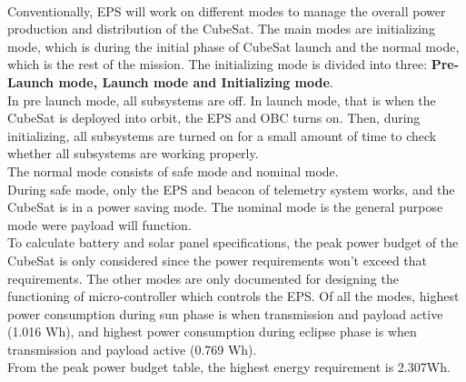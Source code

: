 \\
 Conventionally, EPS will work on different modes to manage the overall power production and distribution of the CubeSat. The main modes are initializing mode, which is during the initial phase of CubeSat launch and the normal mode, which is the rest of the mission. The initializing mode is divided into three: {\bf Pre- Launch mode, Launch mode and Initializing mode}. 
 \\In pre launch mode, all subsystems are off. In launch mode, that is when the CubeSat is deployed into orbit, the EPS and OBC turns on. Then, during initializing, all subsystems are turned on for a small amount of time to check whether all subsystems are working properly. \\The normal mode consists of safe mode and nominal mode. \\During safe mode, only the EPS and beacon of telemetry system works, and the CubeSat is in a power saving mode. The nominal mode is the general purpose mode were payload will function.
 \\
 To calculate battery and solar panel specifications, the peak power budget of the CubeSat is only considered since the power requirements won’t exceed that requirements. The other modes are only documented for designing the functioning of micro-controller which controls the EPS. Of all the modes, highest power consumption during sun phase is when transmission and payload active (1.016 Wh), and highest power consumption during eclipse phase is when transmission and payload active (0.769 Wh).
 \\
 From the peak power budget table, the highest energy requirement is 2.307Wh.
 \\
